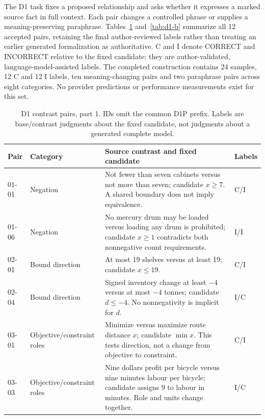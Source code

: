 The D1 task fixes a proposed relationship and asks whether it expresses a marked source fact in full context. Each pair changes a controlled phrase or supplies a meaning-preserving paraphrase. Tables~\ref{tab:d1-a} and~\ref{tab:d1-b} summarize all 12 accepted pairs, retaining the final author-reviewed labels rather than treating an earlier generated formalization as authoritative. C and I denote CORRECT and INCORRECT relative to the fixed candidate; they are author-validated, language-model-assisted labels. The completed construction contains 24 samples, 12 C and 12 I labels, ten meaning-changing pairs and two paraphrase pairs across eight categories. No provider predictions or performance measurements exist for this set.

\begin{table}[htbp]\centering\small
\caption{D1 contrast pairs, part 1. IDs omit the common D1P prefix. Labels are base/contrast judgments about the fixed candidate, not judgments about a generated complete model.}\label{tab:d1-a}
\renewcommand{\arraystretch}{1.18}
\begin{tabularx}{\linewidth}{@{}lp{2.1cm}Xl@{}}\toprule
Pair & Category & Source contrast and fixed candidate & Labels\\\midrule
01-01 & Negation & Not fewer than seven cabinets versus not more than seven; candidate $x\geq7$. A shared boundary does not imply equivalence. & C/I\\
01-06 & Negation & No mercury drum may be loaded versus loading any drum is prohibited; candidate $x\geq1$ contradicts both nonnegative count requirements. & I/I\\
02-01 & Bound direction & At most 19 shelves versus at least 19; candidate $x\leq19$. & C/I\\
02-04 & Bound direction & Signed inventory change at least $-4$ versus at most $-4$ tonnes; candidate $d\leq-4$. No nonnegativity is implicit for $d$. & I/C\\
03-01 & Objective/\allowbreak constraint roles & Minimize versus maximize route distance $x$; candidate $\min x$. This tests direction, not a change from objective to constraint. & C/I\\
03-03 & Objective/\allowbreak constraint roles & Nine dollars profit per bicycle versus nine minutes labour per bicycle; candidate assigns 9 to labour in minutes. Role and units change together. & I/C\\\bottomrule
\end{tabularx}\end{table}

